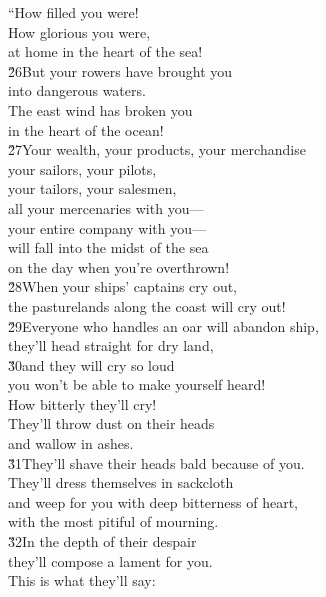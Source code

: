 \begin{poetry}
\poeml ``How filled you were! \\
\poemll    How glorious you were, \\
\poemlll       at home in the heart of the sea! \\
\poeml \v{26}But your rowers have brought you \\
\poemll    into dangerous waters. \\
\poeml The east wind has broken you \\
\poemll    in the heart of the ocean! \\
\poeml \v{27}Your wealth, your products, your merchandise \\
\poemll    your sailors, your pilots, \\
\poeml your tailors, your salesmen, \\
\poemll    all your mercenaries with you--- \\
\poeml your entire company with you--- \\
\poemll    will fall into the midst of the sea \\
\poemlll       on the day when you're overthrown! \\
\poeml \v{28}When your ships' captains cry out, \\
\poemll    the pasturelands along the coast will cry out! \\
\poeml \v{29}Everyone who handles an oar will abandon ship, \\
\poemll    they'll head straight for dry land, \\
\poeml \v{30}and they will cry so loud \\
\poemll    you won't be able to make yourself heard! \\
\poemlll       How bitterly they'll cry! \\
\poeml They'll throw dust on their heads \\
\poemll    and wallow in ashes. \\
\poeml \v{31}They'll shave their heads bald because of you. \\
\poemll    They'll dress themselves in sackcloth \\
\poeml and weep for you with deep bitterness of heart, \\
\poemll    with the most pitiful of mourning. \\
\poeml \v{32}In the depth of their despair \\
\poemll    they'll compose a lament for you. \\
\poeml This is what they'll say:
\end{poetry}

